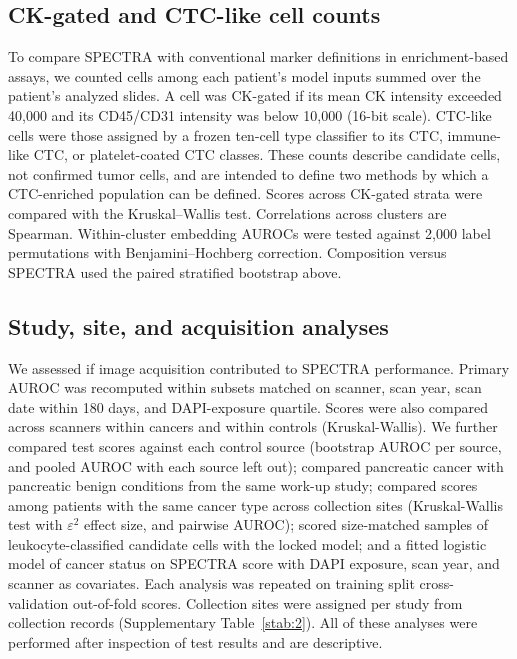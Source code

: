 \documentclass[11pt]{article}
\begin{document}
\subsection*{CK-gated and CTC-like cell counts}

To compare SPECTRA with conventional marker definitions in enrichment-based assays, we counted cells among each patient's model inputs summed over the patient's analyzed slides. A cell was CK-gated if its mean CK intensity exceeded 40,000 and its CD45/CD31 intensity was below 10,000 (16-bit scale). CTC-like cells were those assigned by a frozen ten-cell type classifier to its CTC, immune-like CTC, or platelet-coated CTC classes\cite{naghdloo2025blue}. These counts describe candidate cells, not confirmed tumor cells, and are intended to define two methods by which a CTC-enriched population can be defined. Scores across CK-gated strata were compared with the Kruskal--Wallis test. Correlations across clusters are Spearman. Within-cluster embedding AUROCs were tested against 2,000 label permutations with Benjamini--Hochberg correction. Composition versus SPECTRA used the paired stratified bootstrap above.

\subsection*{Study, site, and acquisition analyses}

We assessed if image acquisition contributed to SPECTRA performance. Primary AUROC was recomputed within subsets matched on scanner, scan year, scan date within 180 days, and DAPI-exposure quartile. Scores were also compared across scanners within cancers and within controls (Kruskal-Wallis). We further compared test scores against each control source (bootstrap AUROC per source, and pooled AUROC with each source left out); compared pancreatic cancer with pancreatic benign conditions from the same work-up study; compared scores among patients with the same cancer type across collection sites (Kruskal-Wallis test with $\varepsilon^2$ effect size, and pairwise AUROC); scored size-matched samples of leukocyte-classified candidate cells with the locked model; and a fitted logistic model of cancer status on SPECTRA score with DAPI exposure, scan year, and scanner as covariates. Each analysis was repeated on training split cross-validation out-of-fold scores. Collection sites were assigned per study from collection records (Supplementary Table~\ref{stab:2}). All of these analyses were performed after inspection of test results and are descriptive.
\end{document}
